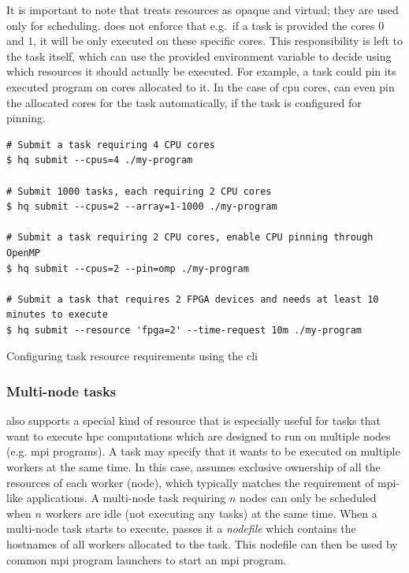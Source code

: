 It is important to note that \hyperqueue{} treats resources as opaque and virtual; they
are used only for scheduling. \hq{} does not enforce that e.g.\ if a task is
provided the cores $0$ and $1$, it will be only executed on
these specific cores. This responsibility is left to the task itself, which can use the provided
environment variable to decide using which resources it should actually be executed. For example, a
task could pin its executed program on cores allocated to it. In the case of
\gls{cpu} cores, \hq{} can even pin the allocated cores for the
task automatically, if the task is configured for pinning.

\begin{listing}[h]
	\begin{verbatim}
# Submit a task requiring 4 CPU cores
$ hq submit --cpus=4 ./my-program

# Submit 1000 tasks, each requiring 2 CPU cores
$ hq submit --cpus=2 --array=1-1000 ./my-program

# Submit a task requiring 2 CPU cores, enable CPU pinning through OpenMP
$ hq submit --cpus=2 --pin=omp ./my-program

# Submit a task that requires 2 FPGA devices and needs at least 10 minutes to execute
$ hq submit --resource 'fpga=2' --time-request 10m ./my-program
	\end{verbatim}
	\caption{Configuring task resource requirements using the \hyperqueue{} \gls{cli}}
	\label{lst:hq-cli-task-resources}
\end{listing}

\subsubsection*{Multi-node tasks}
\hyperqueue{} also supports a special kind of resource that is especially useful for
tasks that want to execute \gls{hpc} computations which are designed to run on
multiple nodes (e.g. \gls{mpi} programs). A task may specify that it wants to be
executed on multiple workers at the same time. In this case, \hq{} assumes
exclusive ownership of all the resources of each worker (node), which typically matches the
requirement of \gls{mpi}-like applications. A multi-node task requiring
$n$ nodes can only be scheduled when $n$ workers are idle
(not executing any tasks) at the same time. When a multi-node task starts to execute,
\hq{} passes it a \emph{nodefile} which contains the hostnames of all
workers allocated to the task. This nodefile can then be used by common \gls{mpi}
program launchers to start an \gls{mpi} program.

